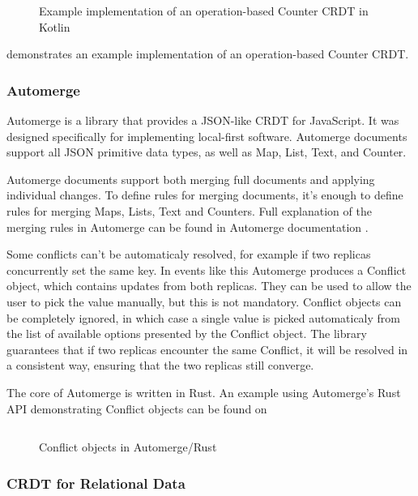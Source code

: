 \documentclass[a4paper, 11pt, oneside]{article}
\theoremstyle{definition}
\begin{document}
\begin{figure}
    \inputminted[frame=single,linenos]{kotlin}{lst/operation-counter.kt}
    \caption{Example implementation of an operation-based Counter CRDT in Kotlin}
    \label{fig:operation-counter}
\end{figure}

 demonstrates an example implementation of an operation-based Counter CRDT.

\subsubsection{Automerge}
Automerge \cite{automerge} is a library that provides a JSON-like CRDT for JavaScript. It was designed specifically for implementing local-first software. Automerge documents support all JSON primitive data types, as well as Map, List, Text, and Counter. 

Automerge documents support both merging full documents and applying individual changes. To define rules for merging documents, it's enough to define rules for merging Maps, Lists, Text and Counters. Full explanation of the merging rules in Automerge can be found in Automerge documentation \cite{automergerules}.

Some conflicts can't be automaticaly resolved, for example if two replicas concurrently set the same key. In events like this Automerge produces a Conflict object, which contains updates from both replicas. They can be used to allow the user to pick the value manually, but this is not mandatory. Conflict objects can be completely ignored, in which case a single value is picked automaticaly from the list of available options presented by the Conflict object. The library guarantees that if two replicas encounter the same Conflict, it will be resolved in a consistent way, ensuring that the two replicas still converge.

The core of Automerge is written in Rust. An example using Automerge's Rust API demonstrating Conflict objects can be found on 

\begin{figure}
    \inputminted[frame=single,linenos,breaklines]{rust}{lst/automerge.rs}
    \caption{Conflict objects in Automerge/Rust}
    \label{fig:automergecode}
\end{figure}

\subsubsection{CRDT for Relational Data}\label{sec:relcrdt}
\end{document}
